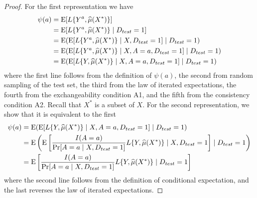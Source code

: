     \begin{proof}
        For the first representation we have 
        \begin{align*}
            \psi(a) &= \operatorname{E}[L\{Y^{a}, \widehat{\mu}(X^*)\}] \\
            & = \operatorname{E}[L\{Y^{a}, \widehat{\mu}(X^*)\}\mid D_{test} = 1] \\
            & = \operatorname{E}(\operatorname{E}[L\{Y^{a}, \widehat{\mu}(X^*)\}\mid X, D_{test} = 1] \mid D_{test} = 1) \\
            & = \operatorname{E}(\operatorname{E}[L\{Y^{a}, \widehat{\mu}(X^*)\}\mid X, A = a, D_{test} = 1] \mid D_{test} = 1) \\
            & = \operatorname{E}(\operatorname{E}[L\{Y, \widehat{\mu}(X^*)\}\mid X, A = a, D_{test} = 1] \mid D_{test} = 1) 
        \end{align*}
        where the first line follows from the definition of $\psi(a)$, the second from random sampling of the test set, the third from the law of iterated expectations, the fourth from the exchangeability condition A1, and the fifth from the consistency condition A2. Recall that $X^*$ is a subset of $X$. For the second representation, we show that it is equivalent to the first 
        \begin{align*}
            \psi(a) &= \operatorname{E}(\operatorname{E}[L\{Y, \widehat{\mu}(X^*)\}\mid X,A = a, D_{test} = 1] \mid D_{test} = 1) \\
            &= \operatorname{E}\left(\operatorname{E}\left[\frac{I(A = a)}{\Pr[A = a \mid X,D_{test} = 1]}L\{Y, \widehat{\mu}(X^*)\} \mid X,D_{test} = 1\right] \mid D_{test} = 1\right)\\
            &= \operatorname{E}\left[\frac{I(A = a)}{\Pr[A = a \mid X,D_{test} = 1]}L\{Y, \widehat{\mu}(X^*)\} \mid D_{test} = 1\right]
        \end{align*}
        where the second line follows from the definition of conditional expectation, and the last reverses the law of iterated expectations.
    \end{proof}
    
